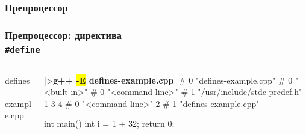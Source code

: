 \documentclass[compress]{beamer}
\newcommand{\shellprompt}{>}
\newcommand{\shellcommand}[1]{\shellprompt \space \textbf{#1}}
\begin{document}
\begin{frame}

    \frametitle{Препроцессор}

    \centering


\end{frame}

\begin{frame}[fragile]

    \frametitle{Препроцессор: директива \\ \texttt{\#define}}

    \begin{columns}[T]

        \begin{column}{0.5\textwidth}

                {defines-example.cpp}

        \end{column}

        \begin{column}{0.5\textwidth}

            \begin{ConsoleWindow}
|\shellcommand{g++ \colorbox{yellow}{-E} defines-example.cpp}|
# 0 "defines-example.cpp"
# 0 "<built-in>"
# 0 "<command-line>"
# 1 "/usr/include/stdc-predef.h" 1 3 4
# 0 "<command-line>" 2
# 1 "defines-example.cpp"




int main() {
    int i = 1 + 32;
    return 0;
}
            \end{ConsoleWindow}

        \end{column}

    \end{columns}

\end{frame}
\end{document}
